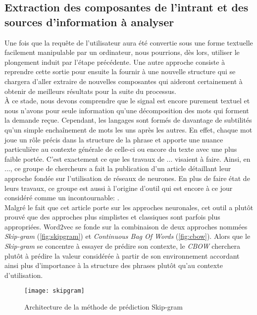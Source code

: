 \subsection{Extraction des composantes de l'intrant et des sources d'information à analyser}
Une fois que la requête de l'utilisateur aura été convertie sous une forme textuelle facilement manipulable par un ordinateur, nous pourrions, dès lors, utiliser le plongement induit par l'étape précédente. Une autre approche consiste à reprendre cette sortie pour ensuite la fournir à une nouvelle structure qui se chargera d'aller extraire de nouvelles composantes qui aideront certainement à obtenir de meilleurs résultats pour la suite du processus. \\

À ce stade, nous devons comprendre que le signal est encore purement textuel et nous n'avons pour seule information qu'une décomposition des mots qui forment la demande reçue. Cependant, les langages sont formés de davantage de subtilités qu'un simple enchaînement de mots les uns après les autres. En effet, chaque mot joue un rôle précis dans la structure de la phrase et apporte une nuance particulière au contexte générale de celle-ci ou encore du texte avec une plus faible portée. C'est exactement ce que les travaux de ... visaient à faire. Ainsi, en ..., ce groupe de chercheurs a fait la publication d'un article détaillant leur approche fondée sur l'utilisation de réseaux de neurones. En plus de faire état de leurs travaux, ce groupe est aussi à l'origine d'outil qui est encore à ce jour considéré comme un incontournable: \cite{word2vec}. \\

Malgré le fait que cet article porte sur les approches neuronales, cet outil a plutôt prouvé que des approches plus simplistes et classiques sont parfois plus appropriées. Word2vec se fonde sur la combinaison de deux approches nommées \textit{Skip-gram} (\autoref{fig:skipgram}) et \textit{Continuous Bag Of Words} (\autoref{fig:cbow}). Alors que le \textit{Skip-gram} se concentre à essayer de prédire son contexte, le \textit{CBOW} cherchera plutôt à prédire la valeur considérée à partir de son environnement accordant ainsi plus d’importance à la structure des phrases plutôt qu’au contexte d’utilisation.\\

\begin{figure}[ht]
  \centering
  \texttt{[image: skipgram]}
  \caption{Architecture de la méthode de prédiction Skip-gram}
  \label{fig:skipgram}
\end{figure}


